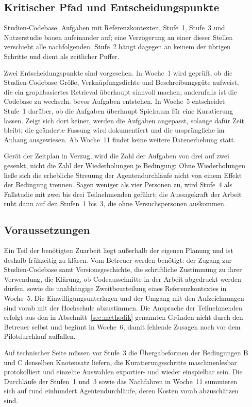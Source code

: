 \subsection{Kritischer Pfad und Entscheidungspunkte}

Studien-Codebase, Aufgaben mit Referenzkontexten, Stufe~1, Stufe~3 und Nutzerstudie bauen aufeinander auf; eine Verzögerung an einer dieser Stellen verschiebt alle nachfolgenden. Stufe~2 hängt dagegen an keinem der übrigen Schritte und dient als zeitlicher Puffer.

Zwei Entscheidungspunkte sind vorgesehen. In Woche~1 wird geprüft, ob die Studien-Codebase Größe, Verknüpfungsdichte und Beschreibungsgüte aufweist, die ein graphbasiertes Retrieval überhaupt sinnvoll machen; andernfalls ist die Codebase zu wechseln, bevor Aufgaben entstehen. In Woche~5 entscheidet Stufe~1 darüber, ob die Aufgaben überhaupt Spielraum für eine Kuratierung lassen. Zeigt sich dort keiner, werden die Aufgaben angepasst, solange dafür Zeit bleibt; die geänderte Fassung wird dokumentiert und die ursprüngliche im Anhang ausgewiesen. Ab Woche~11 findet keine weitere Datenerhebung statt.

Gerät der Zeitplan in Verzug, wird die Zahl der Aufgaben von drei auf zwei gesenkt, nicht die Zahl der Wiederholungen je Bedingung: Ohne Wiederholungen ließe sich die erhebliche Streuung der Agentendurchläufe nicht von einem Effekt der Bedingung trennen. Sagen weniger als vier Personen zu, wird Stufe~4 als Fallstudie mit zwei bis drei Teilnehmenden geführt; die Aussagekraft der Arbeit ruht dann auf den Stufen~1 bis~3, die ohne Versuchspersonen auskommen.

\subsection{Voraussetzungen}

Ein Teil der benötigten Zuarbeit liegt außerhalb der eigenen Planung und ist deshalb frühzeitig zu klären. Vom Betreuer werden benötigt: der Zugang zur Studien-Codebase samt Versionsgeschichte, die schriftliche Zustimmung zu ihrer Verwendung, die Klärung, ob Codeausschnitte in der Arbeit abgedruckt werden dürfen, sowie die unabhängige Zweitbeurteilung eines Referenzkontextes in Woche~5. Die Einwilligungsunterlagen und der Umgang mit den Aufzeichnungen sind vorab mit der Hochschule abzustimmen. Die Ansprache der Teilnehmenden erfolgt aus den in Abschnitt~\ref{sec:methodik} genannten Gründen nicht durch den Betreuer selbst und beginnt in Woche~6, damit fehlende Zusagen noch vor dem Pilotdurchlauf auffallen.

Auf technischer Seite müssen vor Stufe~3 die Übergabeformen der Bedingungen B und C denselben Knotensatz liefern, die Kuratierungsschritte maschinenlesbar protokolliert und einzelne Auswahlen exportier- und wieder einspielbar sein. Die Durchläufe der Stufen~1 und~3 sowie das Nachfahren in Woche~11 summieren sich auf rund einhundert Agentendurchläufe, deren Kosten vorab abzuschätzen sind.

